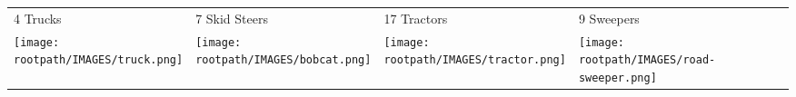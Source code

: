 \begin{tabular}{m{}m{}m{}m{}}
    {\color{ccorange} 4 Trucks} & {\color{ccorange} 7 Skid Steers} & {\color{ccorange} 17 Tractors} & {\color{ccorange} 9 Sweepers} \\
    \texttt{[image: \\rootpath/IMAGES/truck.png]}  & \texttt{[image: \\rootpath/IMAGES/bobcat.png]} & \texttt{[image: \\rootpath/IMAGES/tractor.png]} & \texttt{[image: \\rootpath/IMAGES/road-sweeper.png]}                         
    \end{tabular}
